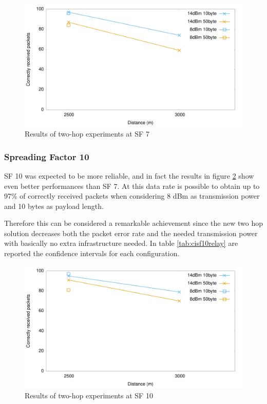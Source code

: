 \begin{figure}[]
\centering
\includegraphics[width=\textwidth]{img/test/relay/sf7}
\caption{Results of two-hop experiments at SF 7}
\label{fig:sf7relay}
\end{figure}


\subsubsection{Spreading Factor 10}
SF 10 was expected to be more reliable, and in fact the results in figure \ref{fig:sf10relay} show even better performances than SF 7. At this data rate is possible to obtain up to 97\% of correctly received packets when considering 8 dBm as transmission power and 10 bytes as payload length.

Therefore this can be considered a remarkable achievement since the new two hop solution decreases both the packet error rate and the needed transmission power with basically no extra infrastructure needed. In table \ref{tab:cisf10relay} are reported the confidence intervals for each configuration. 

\begin{figure}[]
\centering
\includegraphics[width=\textwidth]{img/test/relay/sf10}
\caption{Results of two-hop experiments at SF 10}
\label{fig:sf10relay}
\end{figure}



